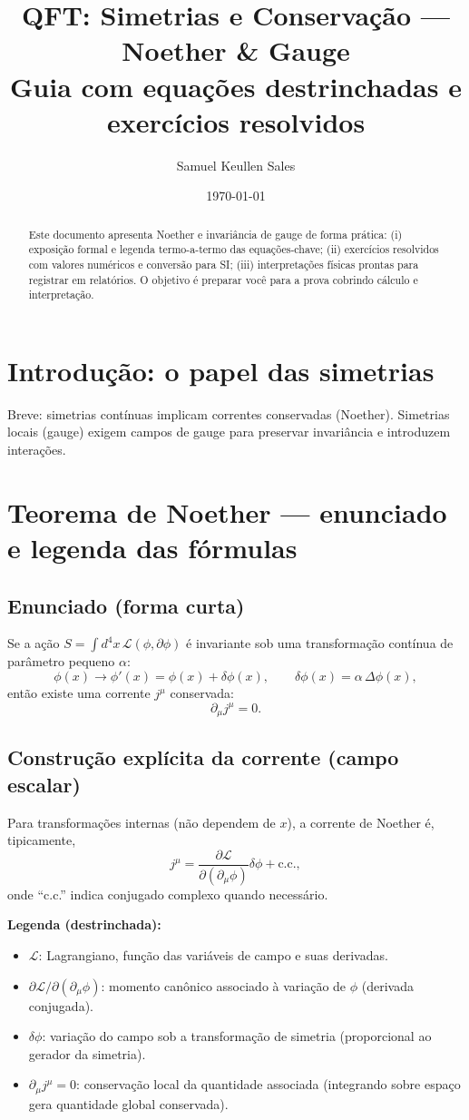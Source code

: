 \documentclass[12pt,a4paper]{article}
\title{QFT: Simetrias e Conservação --- Noether \& Gauge \\ \small{Guia com equações destrinchadas e exercícios resolvidos}}
\author{Samuel Keullen Sales}
\date{\today}
\begin{document}
\maketitle

\begin{abstract}
Este documento apresenta Noether e invariância de gauge de forma prática: (i) exposição formal e legenda termo-a-termo das equações-chave; (ii) exercícios resolvidos com valores numéricos e conversão para SI; (iii) interpretações físicas prontas para registrar em relatórios. O objetivo é preparar você para a prova cobrindo cálculo e interpretação.
\end{abstract}

\tableofcontents
\newpage

\section{Introdução: o papel das simetrias}
Breve: simetrias contínuas implicam correntes conservadas (Noether). Simetrias locais (gauge) exigem campos de gauge para preservar invariância e introduzem interações.

\section{Teorema de Noether — enunciado e legenda das fórmulas}
\subsection{Enunciado (forma curta)}
Se a ação \(S=\int d^4x\,\mathcal{L}(\phi,\partial\phi)\) é invariante sob uma transformação contínua de parâmetro pequeno $\alpha$:
\[
\phi(x)\to\phi'(x)=\phi(x)+\delta\phi(x),\qquad \delta\phi(x)=\alpha\,\Delta\phi(x),
\]
então existe uma corrente \(j^\mu\) conservada:
\[
\boxed{\partial_\mu j^\mu = 0.}
\]

\subsection{Construção explícita da corrente (campo escalar)}
Para transformações internas (não dependem de $x$), a corrente de Noether é, tipicamente,
\[
j^\mu = \frac{\partial\mathcal{L}}{\partial(\partial_\mu\phi)}\delta\phi + \text{c.c.},
\]
onde ``c.c.'' indica conjugado complexo quando necessário.

\textbf{Legenda (destrinchada):}
\begin{itemize}
  \item $\mathcal{L}$: Lagrangiano, função das variáveis de campo e suas derivadas.
  \item $\partial\mathcal{L}/\partial(\partial_\mu\phi)$: momento canônico associado à variação de $\phi$ (derivada conjugada).
  \item $\delta\phi$: variação do campo sob a transformação de simetria (proporcional ao gerador da simetria).
  \item $\partial_\mu j^\mu=0$: conservação local da quantidade associada (integrando sobre espaço gera quantidade global conservada).
\end{itemize}
\end{document}
